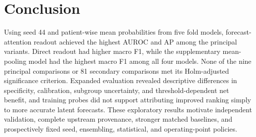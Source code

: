 \section{Conclusion}
Using seed 44 and patient-wise mean probabilities from five fold models, forecast-attention readout achieved the highest AUROC and AP among the principal variants. Direct readout had higher macro F1, while the supplementary mean-pooling model had the highest macro F1 among all four models. None of the nine principal comparisons or 81 secondary comparisons met its Holm-adjusted significance criterion. Expanded evaluation revealed descriptive differences in specificity, calibration, subgroup uncertainty, and threshold-dependent net benefit, and training probes did not support attributing improved ranking simply to more accurate latent forecasts. These exploratory results motivate independent validation, complete upstream provenance, stronger matched baselines, and prospectively fixed seed, ensembling, statistical, and operating-point policies.
